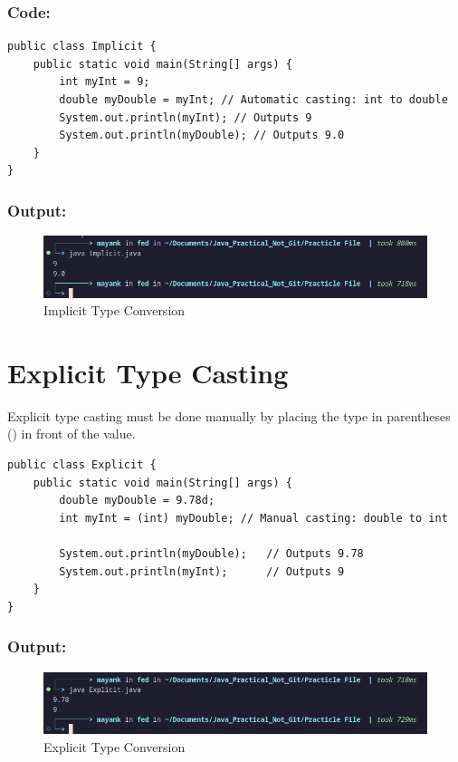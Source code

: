 \documentclass[a4paper,12pt]{article}
\begin{document}
\subsubsection{Code: }
\begin{lstlisting}
public class Implicit {
    public static void main(String[] args) {
        int myInt = 9;
        double myDouble = myInt; // Automatic casting: int to double
        System.out.println(myInt); // Outputs 9
        System.out.println(myDouble); // Outputs 9.0
    }
}    
\end{lstlisting}
\subsubsection{Output: }
\begin{figure}[H]
    \centering
    \includegraphics[width=0.9\linewidth]{images/ImplicitOut.png}
    \caption{Implicit Type Conversion}
    \label{fig:sample_image}
\end{figure}

\section{Explicit Type Casting}
Explicit type casting must be done manually by placing the type in parentheses () in front of the value.
\begin{center}
\end{center}
\begin{lstlisting}
public class Explicit {
    public static void main(String[] args) {
        double myDouble = 9.78d;
        int myInt = (int) myDouble; // Manual casting: double to int
    
        System.out.println(myDouble);   // Outputs 9.78
        System.out.println(myInt);      // Outputs 9
    }
}
\end{lstlisting}
\subsubsection{Output: }
\begin{figure}[H]
    \centering
    \includegraphics[width=0.9\linewidth]{images/ExplicitOut.png}
    \caption{Explicit Type Conversion}
    \label{fig:sample_image}
\end{figure}
\end{document}
